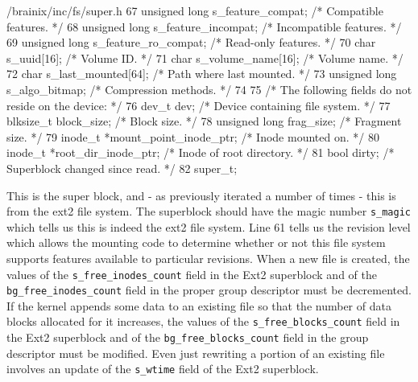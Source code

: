 \documentclass{article}
\begin{document}
\begin{code}{/brainix/inc/fs/super.h}
{67      unsigned long s_feature_compat;    /* Compatible features.            */
68      unsigned long s_feature_incompat;  /* Incompatible features.          */
69      unsigned long s_feature_ro_compat; /* Read-only features.             */
70      char s_uuid[16];                   /* Volume ID.                      */
71      char s_volume_name[16];            /* Volume name.                    */
72      char s_last_mounted[64];           /* Path where last mounted.        */
73      unsigned long s_algo_bitmap;       /* Compression methods.            */
74 
75      /* The following fields do not reside on the device: */
76      dev_t dev;                         /* Device containing file system. */
77      blksize_t block_size;              /* Block size.                    */
78      unsigned long frag_size;           /* Fragment size.                 */
79      inode_t *mount_point_inode_ptr;    /* Inode mounted on.              */
80      inode_t *root_dir_inode_ptr;       /* Inode of root directory.       */
81      bool dirty;                        /* Superblock changed since read. */
82 } super_t;
\end{code}
This is the super block, and - as previously iterated a number of times - this is from the ext2 file system. The superblock should have the magic number \verb|s_magic| which tells us this is indeed the ext2 file system. Line 61 tells us the revision level which allows the mounting code to determine whether or not this file system supports features available to particular revisions. When a new file is created, the values of the \verb|s_free_inodes_count| field in the Ext2 superblock and of the \verb|bg_free_inodes_count| field in the proper group descriptor must be decremented. If the kernel appends some data to an existing file so that the number of data blocks allocated for it increases, the values of the \verb|s_free_blocks_count| field in the Ext2 superblock and of the \verb|bg_free_blocks_count| field in the group descriptor must be modified. Even just rewriting a portion of an existing file involves an update of the \verb|s_wtime| field of the Ext2 superblock. 
\end{document}
